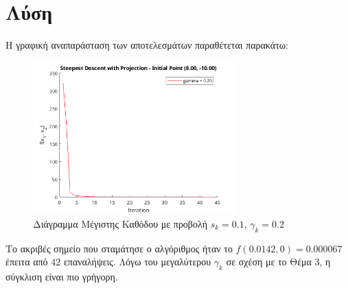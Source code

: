 \documentclass{report}
\begin{document}
\section{Λύση}
Η γραφική αναπαράσταση των αποτελεσμάτων παραθέτεται παρακάτω:
\begin{figure}[H]
    \centering
    \includegraphics[width=0.7\textwidth]{media/thema4.png}
    \caption{Διάγραμμα Μέγιστης Καθόδου με προβολή $s_k = 0.1$, $\gamma_k = 0.2$} 
\end{figure}
Το ακριβές σημείο που σταμάτησε ο αλγόριθμος ήταν το $f(0.0142, 0) = 0.000067$ έπειτα από
$42$ επαναλήψεις. Λόγω του μεγαλύτερου $\gamma_k$ σε σχέση με το Θέμα 3, η σύγκλιση είναι
πιο γρήγορη. 


\nocite{*} %


\end{document}
